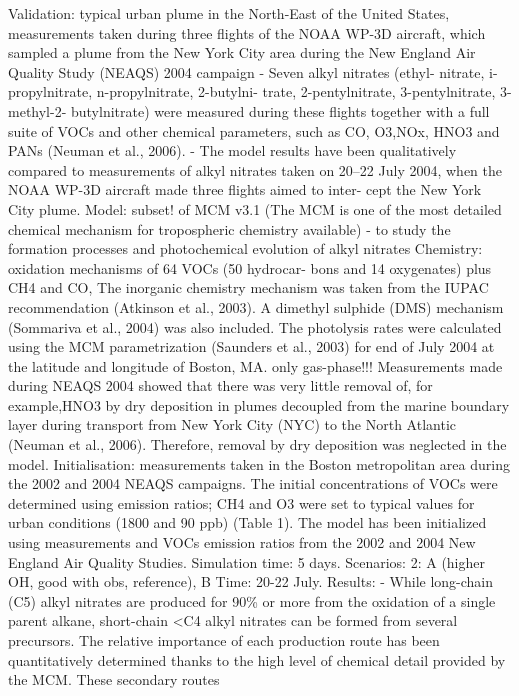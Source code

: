 \documentclass[11pt,a4paper]{article}
\begin{document}
\citep{Sommariva2008}
Validation: typical urban plume in the North-East of the United States, measurements taken during three flights of the NOAA WP-3D aircraft, which sampled a plume from the New York City area during the New England Air Quality Study (NEAQS) 2004 campaign
- Seven alkyl nitrates (ethyl- nitrate, i-propylnitrate, n-propylnitrate, 2-butylni- trate, 2-pentylnitrate, 3-pentylnitrate, 3-methyl-2- butylnitrate) were measured during these flights together with a full suite of VOCs and other chemical parameters, such as CO, O3,NOx, HNO3 and PANs (Neuman et al., 2006).
- The model results have been qualitatively compared to measurements of alkyl nitrates taken on 20–22 July 2004, when the NOAA WP-3D aircraft made three flights aimed to inter- cept the New York City plume.
Model: subset! of MCM v3.1 (The MCM is one of the most detailed chemical mechanism for tropospheric chemistry available)
- to study the formation processes and photochemical evolution of alkyl nitrates
Chemistry: oxidation mechanisms of 64 VOCs (50 hydrocar-
bons and 14 oxygenates) plus CH4 and CO, The inorganic chemistry mechanism was taken from the IUPAC recommendation (Atkinson et al., 2003). A dimethyl sulphide (DMS) mechanism (Sommariva et al., 2004) was also included. The photolysis rates were calculated using the MCM parametrization (Saunders et al., 2003) for end of July 2004 at the latitude and longitude of Boston, MA. only gas-phase!!! Measurements made during NEAQS 2004 showed that there was very little removal of, for example,HNO3 by dry deposition in plumes decoupled from the marine boundary layer during transport from New York City (NYC) to the North Atlantic (Neuman et al., 2006). Therefore, removal by dry deposition was neglected in the model.
Initialisation: measurements taken in the Boston metropolitan area during the 2002 and 2004 NEAQS campaigns. The initial concentrations of VOCs were determined using emission ratios; CH4 and O3 were set to typical values for urban conditions (1800 and 90 ppb) (Table 1). The model has been initialized using measurements and VOCs emission ratios from the 2002 and 2004 New England Air Quality Studies.
Simulation time: 5 days.
Scenarios: 2: A (higher OH, good with obs, reference), B
Time: 20-22 July.
Results:
- While long-chain (C5) alkyl nitrates are produced for 90\% or more from the oxidation of a single parent alkane, short-chain <C4 alkyl nitrates can be formed from several precursors. The relative importance of each production route has been quantitatively determined thanks to the high level of chemical detail provided by the MCM. These secondary routes
\end{document}
